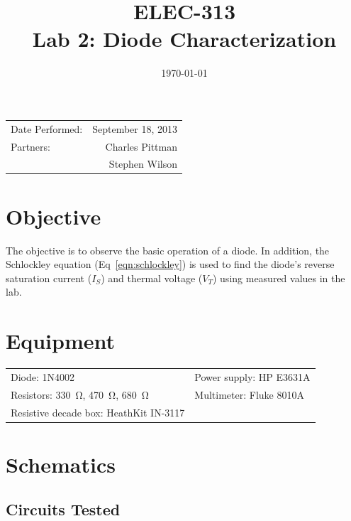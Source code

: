 \documentclass{article}
\author{}
\title{ELEC-313 \\ Lab 2: Diode Characterization \\ }
\date{\today}
\begin{document}
\maketitle

\begin{center}
  \begin{tabular}{lr}
    Date Performed: & September 18, 2013 \\
    Partners: & Charles Pittman \\
    & Stephen Wilson \\
  \end{tabular}
\end{center}

\pagebreak


\renewcommand{\labelenumi}{\alph{enumi}.}

\section{Objective}
\label{sec:objective}

The objective is to observe the basic operation of a diode.  In
addition, the Schlockley equation (Eq~\ref{eqn:schlockley}) is used to
find the diode's reverse saturation current ($I_S$) and thermal
voltage ($V_T$) using measured values in the lab.

\section{Equipment}
\label{sec:equipment}

\begin{tabular}{ll}
  \centering
  Diode: 1N4002 & Power supply: HP E3631A \\
  Resistors: \SI{330}{\ohm}, \SI{470}{\ohm}, \SI{680}{\ohm} & Multimeter: Fluke 8010A \\
  Resistive decade box: HeathKit IN-3117 & \\
\end{tabular}

\section{Schematics}
\label{sec:schematics}

\subsection{Circuits Tested}
\label{sec:ckt_tested}
\end{document}
